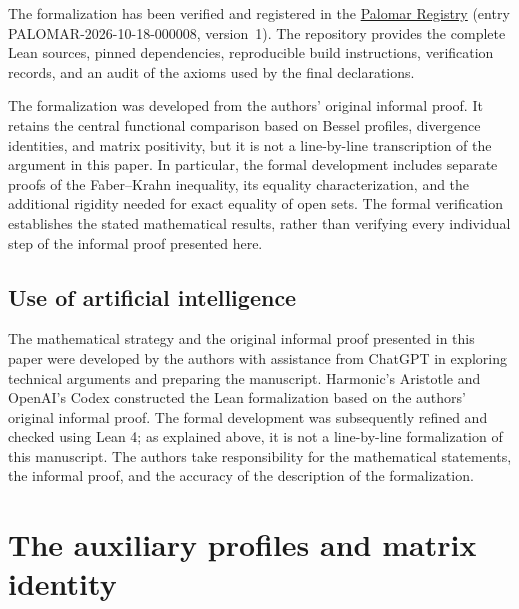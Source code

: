\documentclass[11pt,letterpaper,reqno]{amsart}
\theoremstyle{definition}
\begin{document}
The formalization has been verified and registered in the
\href{https://palomar-registry.org/entry?id=PALOMAR-2026-10-18-000008&version=1}
{Palomar Registry} (entry PALOMAR-2026-10-18-000008, version~1).
The repository provides the complete Lean sources, pinned dependencies,
reproducible build instructions, verification records, and an audit
of the axioms used by the final declarations.

The formalization was developed from the authors' original informal
proof. It retains the central functional comparison based on Bessel
profiles, divergence identities, and matrix positivity, but it is
not a line-by-line transcription of the argument in this paper.
In particular, the formal development includes separate proofs of
the Faber--Krahn inequality, its equality characterization, and the
additional rigidity needed for exact equality of open sets.
The formal verification establishes the stated mathematical results,
rather than verifying every individual step of the informal
proof presented here.


\subsection*{Use of artificial intelligence}

The mathematical strategy and the original informal proof presented
in this paper were developed by the authors with assistance from ChatGPT in exploring technical arguments and preparing the
manuscript. Harmonic's Aristotle and OpenAI's Codex constructed the Lean formalization
based on the authors' original informal proof. The formal development
was subsequently refined and checked using Lean 4; as explained
above, it is not a line-by-line formalization of this manuscript.
The authors take responsibility for the mathematical statements,
the informal proof, and the accuracy of the description of the
formalization.


\section{The auxiliary profiles and matrix identity}\label{sec:calibration}
\end{document}
